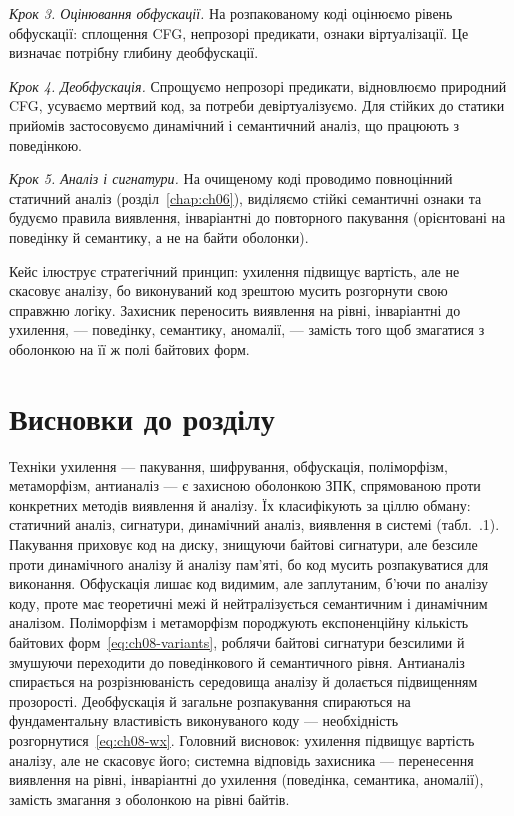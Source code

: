 \emph{Крок 3. Оцінювання обфускації.} На розпакованому коді оцінюємо рівень обфускації: сплощення CFG, непрозорі предикати, ознаки віртуалізації. Це визначає потрібну глибину деобфускації.

\emph{Крок 4. Деобфускація.} Спрощуємо непрозорі предикати, відновлюємо природний CFG, усуваємо мертвий код, за потреби девіртуалізуємо. Для стійких до статики прийомів застосовуємо динамічний і семантичний аналіз, що працюють з поведінкою.

\emph{Крок 5. Аналіз і сигнатури.} На очищеному коді проводимо повноцінний статичний аналіз (розділ~\ref{chap:ch06}), виділяємо стійкі семантичні ознаки та будуємо правила виявлення, інваріантні до повторного пакування (орієнтовані на поведінку й семантику, а не на байти оболонки).

Кейс ілюструє стратегічний принцип: ухилення підвищує вартість, але не скасовує аналізу, бо виконуваний код зрештою мусить розгорнути свою справжню логіку. Захисник переносить виявлення на рівні, інваріантні до ухилення, --- поведінку, семантику, аномалії, --- замість того щоб змагатися з оболонкою на її ж полі байтових форм.

\section*{Висновки до розділу}

Техніки ухилення --- пакування, шифрування, обфускація, поліморфізм, метаморфізм, антианаліз --- є захисною оболонкою ЗПК, спрямованою проти конкретних методів виявлення й аналізу. Їх класифікують за ціллю обману: статичний аналіз, сигнатури, динамічний аналіз, виявлення в системі (табл.~\thechapter.1). Пакування приховує код на диску, знищуючи байтові сигнатури, але безсиле проти динамічного аналізу й аналізу пам'яті, бо код мусить розпакуватися для виконання. Обфускація лишає код видимим, але заплутаним, б'ючи по аналізу коду, проте має теоретичні межі й нейтралізується семантичним і динамічним аналізом. Поліморфізм і метаморфізм породжують експоненційну кількість байтових форм~\eqref{eq:ch08-variants}, роблячи байтові сигнатури безсилими й змушуючи переходити до поведінкового й семантичного рівня. Антианаліз спирається на розрізнюваність середовища аналізу й долається підвищенням прозорості. Деобфускація й загальне розпакування спираються на фундаментальну властивість виконуваного коду --- необхідність розгорнутися~\eqref{eq:ch08-wx}. Головний висновок: ухилення підвищує вартість аналізу, але не скасовує його; системна відповідь захисника --- перенесення виявлення на рівні, інваріантні до ухилення (поведінка, семантика, аномалії), замість змагання з оболонкою на рівні байтів.

